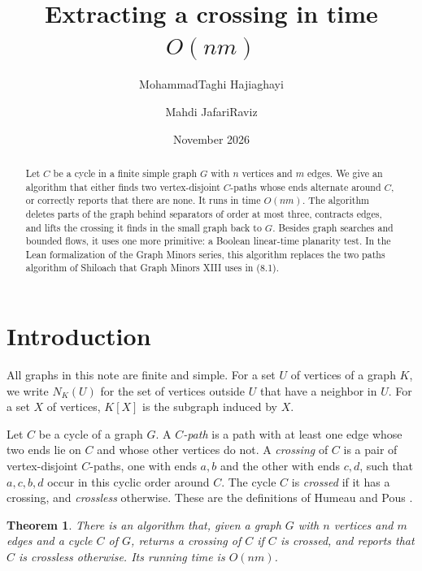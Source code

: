 \documentclass[11pt]{article}
\title{\textbf{Extracting a crossing in time $O(nm)$}}
\author{MohammadTaghi Hajiaghayi \and Mahdi JafariRaviz}
\date{November 2026}
\newtheorem*{theorem}{Theorem}
\begin{document}
\maketitle

\begin{abstract}
Let $C$ be a cycle in a finite simple graph $G$ with $n$ vertices and $m$
edges. We give an algorithm that either finds two vertex-disjoint $C$-paths
whose ends alternate around $C$, or correctly reports that there are none. It
runs in time $O(nm)$. The algorithm deletes parts of the graph behind
separators of order at most three, contracts edges, and lifts the crossing it
finds in the small graph back to $G$. Besides graph searches and bounded flows,
it uses one more primitive: a Boolean linear-time planarity test. In the Lean
formalization of the Graph Minors series, this algorithm replaces the two
paths algorithm of Shiloach that Graph Minors XIII uses in (8.1).
\end{abstract}

\section*{Introduction}

All graphs in this note are finite and simple. For a set $U$ of vertices of a
graph $K$, we write $N_K(U)$ for the set of vertices outside $U$ that have a
neighbor in $U$. For a set $X$ of vertices, $K[X]$ is the subgraph induced by
$X$.

Let $C$ be a cycle of a graph $G$. A \emph{$C$-path} is a path with at least
one edge whose two ends lie on $C$ and whose other vertices do not. A
\emph{crossing} of $C$ is a pair of vertex-disjoint $C$-paths, one with ends
$a,b$ and the other with ends $c,d$, such that $a,c,b,d$ occur in this cyclic
order around $C$. The cycle $C$ is \emph{crossed} if it has a crossing, and
\emph{crossless} otherwise. These are the definitions of Humeau and Pous
\cite[Definition~2.4, page~7]{HP25}.

\begin{theorem}
There is an algorithm that, given a graph $G$ with $n$ vertices and $m$ edges
and a cycle $C$ of $G$, returns a crossing of $C$ if $C$ is crossed, and
reports that $C$ is crossless otherwise. Its running time is $O(nm)$.
\end{theorem}
\end{document}
